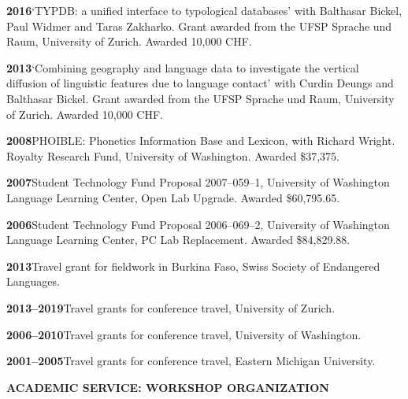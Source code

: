 \documentclass[11pt]{article}
\newcommand{\hangpara}{
 \setlength{\parindent}{0in} %
 \hangindent=0.42in %
}
\begin{document}
\vskip 6pt
\hangpara
{\bf 2016}\hspace{1ex}`TYPDB: a unified interface to typological databases' with Balthasar Bickel, Paul Widmer and Taras Zakharko. Grant awarded from the UFSP Sprache und Raum, University of Zurich. Awarded 10,000 CHF.

\vskip 6pt
\hangpara
{\bf 2013}\hspace{1ex}`Combining geography and language data to investigate the vertical diffusion of linguistic features due to language contact' with Curdin Deungs and Balthasar Bickel. Grant awarded from the UFSP Sprache und Raum, University of Zurich. Awarded 10,000 CHF.

\vskip 6pt
\hangpara
{\bf 2008}\hspace{1ex}PHOIBLE: Phonetics Information Base and Lexicon, with Richard Wright. Royalty Research Fund, University of Washington. Awarded \$37,375.

\vskip 6pt
\hangpara
{\bf 2007}\hspace{1ex}Student Technology Fund Proposal 2007--059--1, University of Washington Language Learning Center, Open Lab Upgrade. Awarded \$60,795.65.

\vskip 6pt
\hangpara
{\bf 2006}\hspace{1ex}Student Technology Fund Proposal 2006--069--2, University of Washington Language Learning Center, PC Lab Replacement. Awarded \$84,829.88.

\vskip 6pt
\hangpara
{\bf 2013}\hspace{1ex}Travel grant for fieldwork in Burkina Faso, Swiss Society of Endangered Languages.

\vskip 6pt
\hangpara
{\bf 2013--2019}\hspace{1ex}Travel grants for conference travel, University of Zurich.

\vskip 6pt
\hangpara
{\bf 2006--2010}\hspace{1ex}Travel grants for conference travel, University of Washington.

\vskip 6pt
\hangpara
{\bf 2001--2005}\hspace{1ex}Travel grants for conference travel, Eastern Michigan University.

\clearpage
\vskip 20pt
\begin{flushleft}
{\bf ACADEMIC SERVICE: WORKSHOP ORGANIZATION}
\end{flushleft}

\end{document}

